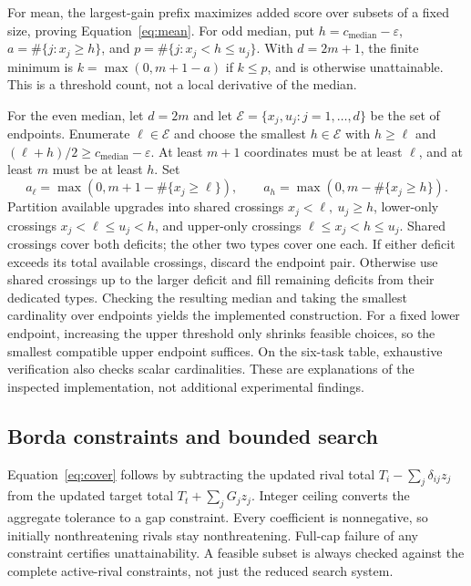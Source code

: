 \documentclass{article}
\newcommand{\tol}{\varepsilon}
\begin{document}
For mean, the largest-gain prefix maximizes added score over subsets of a fixed size, proving Equation~\eqref{eq:mean}. For odd median, put $h=c_{\mathrm{median}}-\tol$, $a=\#\{j:x_j\geq h\}$, and $p=\#\{j:x_j<h\leq u_j\}$. With $d=2m+1$, the finite minimum is $k=\max(0,m+1-a)$ if $k\leq p$, and is otherwise unattainable. This is a threshold count, not a local derivative of the median.

For the even median, let $d=2m$ and let $\mathcal{E}=\{x_j,u_j:j=1,\ldots,d\}$ be the set of endpoints. Enumerate $\ell\in\mathcal{E}$ and choose the smallest $h\in\mathcal{E}$ with $h\geq\ell$ and $(\ell+h)/2\geq c_{\mathrm{median}}-\tol$. At least $m+1$ coordinates must be at least $\ell$, and at least $m$ must be at least $h$. Set
\[
 a_\ell=\max(0,m+1-\#\{x_j\geq\ell\}),\qquad
 a_h=\max(0,m-\#\{x_j\geq h\}).
\]
Partition available upgrades into shared crossings $x_j<\ell,\ u_j\geq h$, lower-only crossings $x_j<\ell\leq u_j<h$, and upper-only crossings $\ell\leq x_j<h\leq u_j$. Shared crossings cover both deficits; the other two types cover one each. If either deficit exceeds its total available crossings, discard the endpoint pair. Otherwise use shared crossings up to the larger deficit and fill remaining deficits from their dedicated types. Checking the resulting median and taking the smallest cardinality over endpoints yields the implemented construction. For a fixed lower endpoint, increasing the upper threshold only shrinks feasible choices, so the smallest compatible upper endpoint suffices. On the six-task table, exhaustive verification also checks scalar cardinalities. These are explanations of the inspected implementation, not additional experimental findings.

\subsection{Borda constraints and bounded search}
Equation~\eqref{eq:cover} follows by subtracting the updated rival total $T_i-\sum_j\delta_{ij}z_j$ from the updated target total $T_t+\sum_jG_jz_j$. Integer ceiling converts the aggregate tolerance to a gap constraint. Every coefficient is nonnegative, so initially nonthreatening rivals stay nonthreatening. Full-cap failure of any constraint certifies unattainability. A feasible subset is always checked against the complete active-rival constraints, not just the reduced search system.
\end{document}
